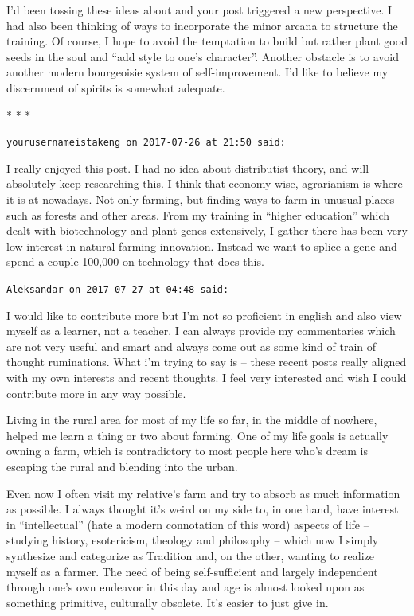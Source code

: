 I'd been tossing these ideas about and your post triggered a new perspective. I had also been thinking of ways to incorporate the minor arcana to structure the training. Of course, I hope to avoid the temptation to build but rather plant good seeds in the soul and ``add style to one's character''. Another obstacle is to avoid another modern bourgeoisie system of self-improvement. I'd like to believe my discernment of spirits is somewhat adequate.



\begin{center}* * *\end{center}

\begin{footnotesize}
\begin{sffamily}
\texttt{yourusernameistakeng on 2017-07-26 at 21:50 said:}

I really enjoyed this post. I had no idea about distributist theory, and will absolutely keep researching this. I think that economy wise, agrarianism is where it is at nowadays. Not only farming, but finding ways to farm in unusual places such as forests and other areas. From my training in ``higher education'' which dealt with biotechnology and plant genes extensively, I gather there has been very low interest in natural farming innovation. Instead we want to splice a gene and spend a couple 100,000 on technology that does this.

\hfill

\texttt{Aleksandar on 2017-07-27 at 04:48 said:}

I would like to contribute more but I'm not so proficient in english and also view myself as a learner, not a teacher. I can always provide my commentaries which are not very useful and smart and always come out as some kind of train of thought ruminations. What i'm trying to say is -- these recent posts really aligned with my own interests and recent thoughts. I feel very interested and wish I could contribute more in any way possible.

Living in the rural area for most of my life so far, in the middle of nowhere, helped me learn a thing or two about farming. One of my life goals is actually owning a farm, which is contradictory to most people here who's dream is escaping the rural and blending into the urban.

Even now I often visit my relative's farm and try to absorb as much information as possible. I always thought it's weird on my side to, in one hand, have interest in ``intellectual'' (hate a modern connotation of this word) aspects of life -- studying history, esotericism, theology and philosophy -- which now I simply synthesize and categorize as Tradition and, on the other, wanting to realize myself as a farmer. The need of being self-sufficient and largely independent through one's own endeavor in this day and age is almost looked upon as something primitive, culturally obsolete. It's easier to just give in.


\end{sffamily}
\end{footnotesize}
